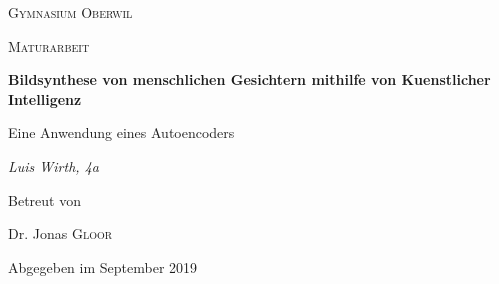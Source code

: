 \documentclass[../main]{subfiles}
\begin{document}
\begin{titlepage}
    \centering
    
    {\scshape\LARGE Gymnasium Oberwil\par}
    \vspace{1cm}
    {\scshape\Large Maturarbeit\par}
    \vspace{1.5cm}
    {\huge\bfseries Bildsynthese von menschlichen Gesichtern mithilfe von Kuenstlicher Intelligenz\par}
    \vspace{0.2cm}
    {\large Eine Anwendung eines Autoencoders\par}
    \vspace{2cm}
    {\Large\itshape Luis Wirth, 4a\par}
    \vfill
    Betreut von\par
    Dr. Jonas \textsc{Gloor}
    
    \vfill
    {\large Abgegeben im September 2019\par}
\end{titlepage}
\end{document}
